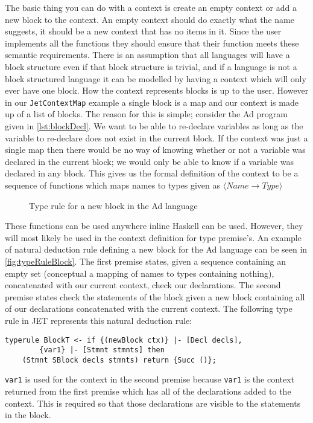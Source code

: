 The basic thing you can do with a context is create an empty context or add a new block to the context.
An empty context should do exactly what the name suggests, it should be a new context that has no items in it.
Since the user implements all the functions they should ensure that their function meets these semantic requirements.
There is an assumption that all languages will have a block structure even if that block structure is trivial, and if a language is not a block structured language it can be modelled by having a context which will only ever have one block.
How the context represents blocks is up to the user.
However in our \texttt{JetContextMap} example a single block is a map and our context is made up of a list of blocks.
The reason for this is simple; consider the Ad program given in \autoref{lst:blockDecl}.
We want to be able to re-declare variables as long as the variable to re-declare does not exist in the current block.
If the context was just a single map then there would be no way of knowing whether or not a variable was declared in the current block; we would only be able to know if a variable was declared in any block.
This gives us the formal definition of the context to be a sequence of functions which maps names to types given as $\langle Name \rightarrow Type \rangle$

\begin{figure}[]
    \centering
    \begin{prooftree}
    \end{prooftree}
    \caption{Type rule for a new block in the Ad language}
    \label{fig:typeRuleBlock}
\end{figure}

These functions can be used anywhere inline Haskell can be used.
However, they will most likely be used in the context definition for type premise's.
An example of natural deduction rule defining a new block for the Ad language can be seen in \autoref{fig:typeRuleBlock}.
The first premise states, given a sequence containing an empty set (conceptual a mapping of names to types containing nothing), concatenated with our current context, check our declarations.
The second premise states check the statements of the block given a new block containing all of our declarations concatenated with the current context.
The following type rule in JET represents this natural deduction rule:
\begin{lstlisting}
typerule BlockT <- if {(newBlock ctx)} |- [Decl decls],
        {var1} |- [Stmnt stmnts] then
    (Stmnt SBlock decls stmnts) return {Succ ()};
\end{lstlisting}
\texttt{var1} is used for the context in the second premise because \texttt{var1} is the context returned from the first premise which has all of the declarations added to the context.
This is required so that those declarations are visible to the statements in the block.

